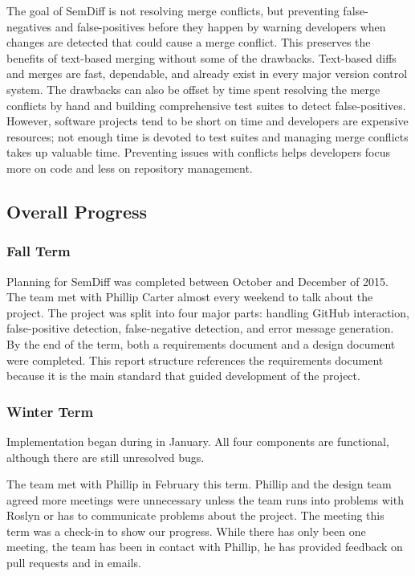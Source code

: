\documentclass[draftclsnofoot,onecolumn]{IEEEtran}
\begin{document}
The goal of SemDiff is not resolving merge conflicts, but preventing 
false-negatives and false-positives before they happen by warning developers 
when changes are detected that could cause a merge conflict. This preserves the 
benefits of text-based merging without some of the drawbacks. Text-based diffs 
and merges are fast, dependable, and already exist in every major version 
control system. The drawbacks can also be offset by time spent resolving the 
merge conflicts by hand and building comprehensive test suites to detect 
false-positives. However, software projects tend to be short on time and 
developers are expensive resources; not enough time is devoted to test suites 
and managing merge conflicts takes up valuable time. Preventing issues with 
conflicts helps developers focus more on code and less on repository management.

\subsection{Overall Progress}%

\subsubsection{Fall Term}

Planning for SemDiff was completed between October and December of 2015. The 
team met with Phillip Carter almost every weekend to talk about the project. 
The project was split into four major parts: handling GitHub interaction, 
false-positive detection, false-negative detection, and error message 
generation. By the end of the term, both a requirements document and a design 
document were completed. This report structure references the requirements 
document because it is the main standard that guided development of the project.

\subsubsection{Winter Term}

Implementation began during in January. All four components are functional, 
although there are still unresolved bugs. 

The team met with Phillip in February this term. Phillip and the design team 
agreed more meetings were unnecessary unless the team runs into problems with 
Roslyn or has to communicate problems about the project. The meeting this term 
was a check-in to show our progress. While there has only been one meeting, the 
team has been in contact with Phillip, he has provided feedback on pull requests 
and in emails.
\end{document}
